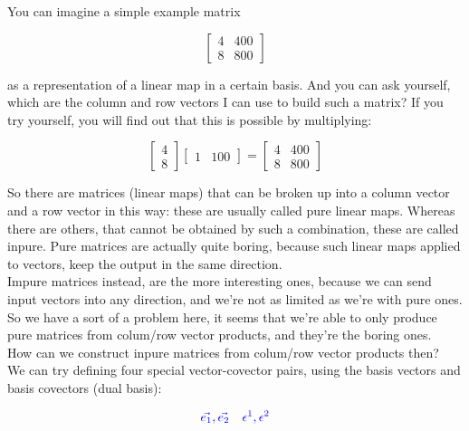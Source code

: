 You can imagine a simple example matrix 

\begin{equation}
    \begin{bmatrix}
        4 & 400\\
        8 & 800
    \end{bmatrix}
\end{equation}

as a representation of a linear map in a certain basis. And you can ask yourself, which are the column and row vectors I can use to build such a matrix?
If you try yourself, you will find out that this is possible by multiplying:

\begin{equation}
    \begin{bmatrix}
        4\\
        8
    \end{bmatrix}
    \begin{bmatrix}
        1 & 100
    \end{bmatrix} = \begin{bmatrix}
        4 & 400\\
        8 & 800
    \end{bmatrix}
\end{equation}

So there are matrices (linear maps) that can be broken up into a column vector and a row vector in this way: these are usually called pure linear maps.
Whereas there are others, that cannot be obtained by such a combination, these are called inpure.
Pure matrices are actually quite boring, because such linear maps applied to vectors, keep the output in the same direction.\\

Impure matrices instead, are the more interesting ones, because we can send input vectors into any direction, and we're not as limited as we're with pure ones.
So we have a sort of a problem here, it seems that we're able to only produce pure matrices from colum/row vector products, and they're the boring ones.\\
How can we construct inpure matrices from colum/row vector products then? \\

We can try defining four special vector-covector pairs, using the basis vectors and basis covectors (dual basis):

\begin{align*}
    \color{blue}{\vec{e_1}, \vec{e_2}} && \color{blue}{\epsilon^1, \epsilon^2}
\end{align*}

